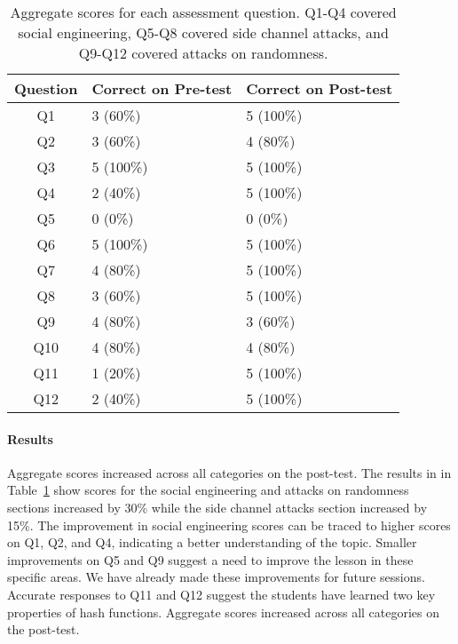 \begin{table}
  \centering
  \scriptsize
  \begin{tabular}{c | l | l}
Question &  Correct on Pre-test   & Correct on Post-test \\
\hline
Q1   & 3 (60\%)  & 5 (100\%) \\
Q2   & 3 (60\%)  & 4 (80\%)  \\
Q3   & 5 (100\%) & 5 (100\%) \\
Q4   & 2 (40\%)  & 5 (100\%) \\
\hline
Q5   & 0 (0\%)   & 0 (0\%)   \\
Q6   & 5 (100\%) & 5 (100\%) \\
Q7   & 4 (80\%)  & 5 (100\%) \\
Q8   & 3 (60\%)  & 5 (100\%) \\
\hline
Q9   & 4 (80\%)  & 3 (60\%)  \\
Q10  & 4 (80\%)  & 4 (80\%)  \\
Q11  & 1 (20\%)  & 5 (100\%) \\
Q12  & 2 (40\%)  & 5 (100\%) \\
\end{tabular}

\caption{Aggregate scores for each assessment question. Q1-Q4 covered
  social engineering, Q5-Q8 covered side channel attacks, and Q9-Q12
  covered attacks on randomness.}
\label{fig:results}
\end{table}

\paragraph{Results}
Aggregate scores increased across all categories on the post-test.
The results in in Table~\ref{fig:results} show scores for the social engineering and attacks on randomness sections
increased by 30\% while the side channel attacks section increased by
15\%.
The improvement in social engineering scores can be traced to
higher scores on
Q1, Q2, and Q4,
indicating a better understanding of the topic.
Smaller improvements on Q5 and Q9 suggest a need to improve the lesson in
these specific areas.  We have already made these improvements for future
sessions.
Accurate responses to Q11 and Q12
suggest the students have learned two
key properties of hash functions.
Aggregate scores increased across all categories on the post-test.


